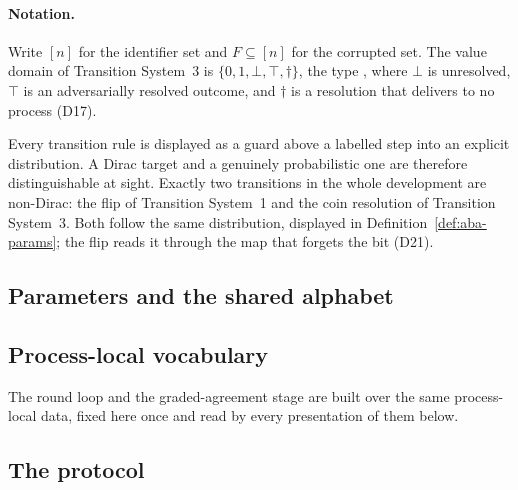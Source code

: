 \paragraph{Notation.}
Write $[n]$ for the identifier set and $F \subseteq [n]$ for the corrupted set.
The value domain of Transition System~3 is $\{0,1,\bot,\top,\dagger\}$, the type
, where $\bot$ is unresolved, $\top$ is an adversarially
resolved outcome, and $\dagger$ is a resolution that delivers to no process
(D17).

Every transition rule is displayed as a guard above a labelled step into an
explicit distribution.
A Dirac target and a genuinely probabilistic one are therefore distinguishable
at sight.
Exactly two transitions in the whole development are non-Dirac: the flip of
Transition System~1 and the coin resolution of Transition System~3.
Both follow the same distribution, displayed in
Definition~\ref{def:aba-params}; the flip reads it through the map that
forgets the bit (D21).

\subsection{Parameters and the shared alphabet}





\subsection{Process-local vocabulary}

The round loop and the graded-agreement stage are built over the same
process-local data, fixed here once and read by every presentation of them
below.





\subsection{The protocol}
\label{sec:aba-perproc}

